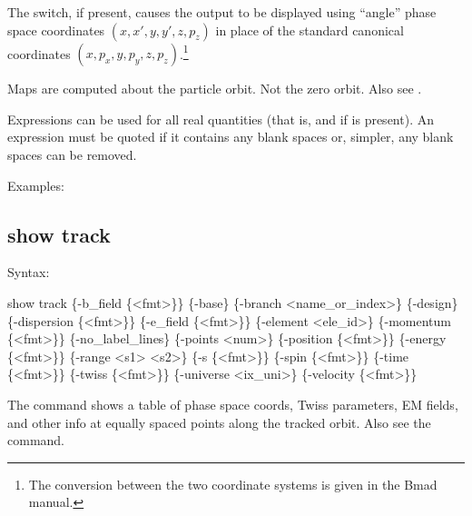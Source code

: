 {{{{{{{{{{The  switch, if present, causes the output to be displayed using ``angle''
phase space coordinates $(x, x', y, y', z, p_z)$ in place of the standard \bmad canonical
coordinates $(x, p_x, y, p_y, z, p_z)$.\footnote
  {
The conversion between the two coordinate systems is given in the Bmad manual.
  }

Maps are computed about the particle orbit. Not the zero orbit. Also see .

Expressions can be used for all real quantities (that is,  and  if  is
present). An expression must be quoted if it contains any blank spaces or, simpler, any blank spaces
can be removed.

Examples:

\vfill\break


\subsection{show track}
\label{s:show.track}

Syntax:
\begin{example}
  show track \{-b_field \{<fmt>\}\} \{-base\} \{-branch <name_or_index>\} \{-design\} 
      \{-dispersion \{<fmt>\}\} \{-e_field \{<fmt>\}\} \{-element <ele_id>\} \{-momentum \{<fmt>\}\} 
      \{-no_label_lines\} \{-points <num>\} \{-position \{<fmt>\}\} \{-energy \{<fmt>\}\} 
      \{-range <s1> <s2>\} \{-s \{<fmt>\}\} \{-spin \{<fmt>\}\} \{-time \{<fmt>\}\} 
      \{-twiss \{<fmt>\}\} \{-universe <ix_uni>\} \{-velocity \{<fmt>\}\}
\end{example}

The  command shows a table of phase space coords, Twiss parameters, EM fields, and
other info at equally spaced points along the tracked orbit. Also see the 
command.

}}}}}}}}}}
